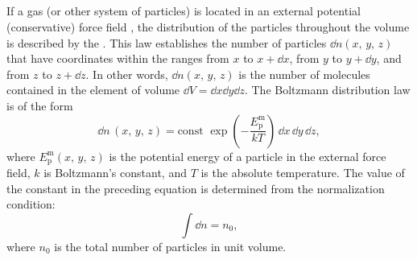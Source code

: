 \subsection{}\label{10.4.2} If a gas (or other system of particles) is located in an external potential (conservative) force field , the distri­bution of the particles throughout the volume is described by the . This law establishes the number of particles $\dd n (x, \,y, \,z)$ that have coordinates within the ranges from $x$ to $x+ \dd x$, from $y$ to $y+ \dd y$, and from $z$ to $z+ \dd z$. In other words, $\dd n (x, \, y, \, z)$ is the number of molecules contained in the element of volume $\dd V = \dd x \dd y \dd z$. The Boltzmann distribution law is of the form
\begin{equation*}%
\dd n \, (x, \,y, \,z)= \textrm{const}\,\, \exp \left( -\frac{E_{\text{p}}^{\textrm{m}}}{kT}\right) \, \dd x \, \dd y \, \dd z,
\end{equation*}
where $E_{\textrm{p}}^{\textrm{m}}(x, \,y,\, z)$ is the potential energy of a particle in the external force field, $k$ is Boltzmann's constant, and $T$ is the absolute temperature. The value of the constant in the preceding equation is determined from the normalization condition:
\begin{equation*}%
\int \dd n = n_{0},
\end{equation*}
where $n_{0}$ is the total number of particles in unit volume.


